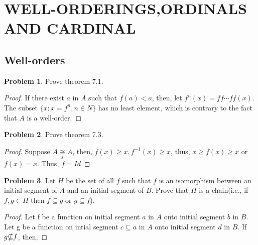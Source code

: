 \documentclass[a4paper,11pt]{article}%
\theoremstyle{remark}
\theoremstyle{definition}
\newtheorem{problem}{Problem}[subsection]
\begin{document}
\section{WELL-ORDERINGS,ORDINALS AND CARDINAL}
\subsection{Well-orders}
\begin{problem}
    Prove theorem 7.1.
    \begin{proof}
        If there exist $a$ in $A$ such that $f(a)<a$, then, let $f^n(x)=ff\cdots ff(x)$.
        The subset $\{x:x=f^n,n\in N\}$ has no least element, which is contrary to the fact that $A$ is a well-order.
    \end{proof}
\end{problem}
\begin{problem}
    Prove theorem 7.3.
    \begin{proof}
        Suppose $\underbar{A}\underset{f}{\cong}\underbar{A}$, then,
        $f(x)\geq x, f^{-1}(x)\geq x$, thus, $x\geq f(x)\geq x$ or $f(x)=x$. 
        Thus, $f=Id$
    \end{proof}
\end{problem}
\begin{problem}
    Let $H$ be the set of all $f$ such that $f$ is an isomorphism between 
    an initial segment of $\underbar{A}$ and an initial segment of $\underbar{B}$.
    Prove that $H$ is a chain(i.e., if $f,g\in H$ then $f\subseteq g$ or $g\subseteq f$).
    \begin{proof}
        Let f be a function on initial segment $a$ in $A$ onto initial segment 
        $b$ in $B$. Let g be a function on intial segment $c\subseteq a$ in $A$
        onto initial segment $d$ in $B$. If $g\slashed{\subseteq}f$, then,
    \end{proof}
\end{problem}
\end{document}
